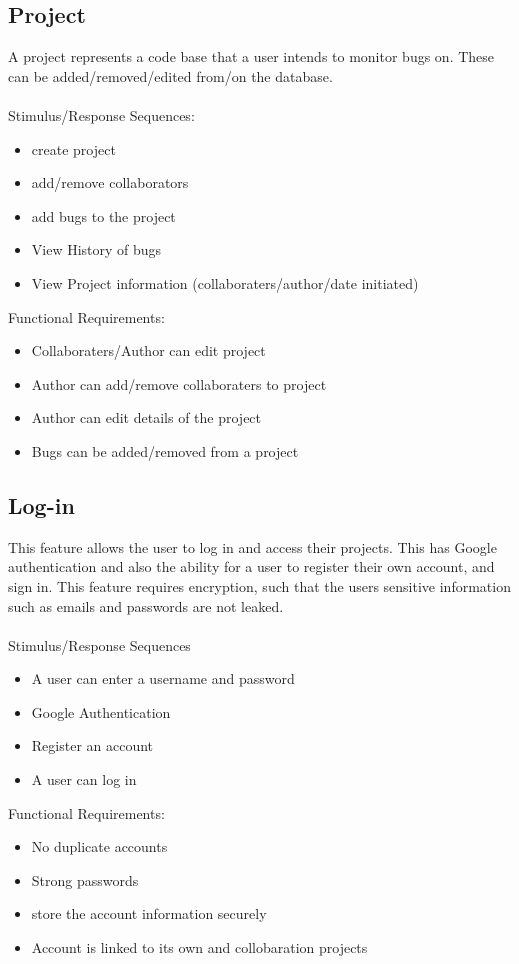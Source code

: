 \documentclass{article}
\begin{document}
\subsection{Project}
A project represents a code base that a user intends to monitor bugs on. These can be added/removed/edited from/on the \gls{database}.
\\ \\
Stimulus/Response Sequences:
\begin{itemize}
\item create project
\item add/remove collaborators
\item add bugs to the project
\item View History of bugs
\item View Project information (collaboraters/author/date initiated)
\end{itemize}
Functional Requirements:
\begin{itemize}
\item Collaboraters/Author can edit project
\item Author can add/remove collaboraters to project
\item Author can edit details of the project
\item Bugs can be added/removed from a project
\end{itemize}

\subsection{Log-in}
This feature allows the user to log in and access their projects. This has Google authentication and also the ability for a user to register their own account, and sign in. This feature requires \gls{encryption}, such that the users sensitive information such as emails and passwords are not leaked.
\\ \\
Stimulus/Response Sequences
\begin{itemize}
\item A user can enter a username and password
\item Google Authentication
\item Register an account
\item A user can log in
\end{itemize}
Functional Requirements:
\begin{itemize}
\item No duplicate accounts
\item Strong passwords
\item store the account information securely
\item Account is linked to its own and collobaration projects
\end{itemize}
\newpage
\end{document}
